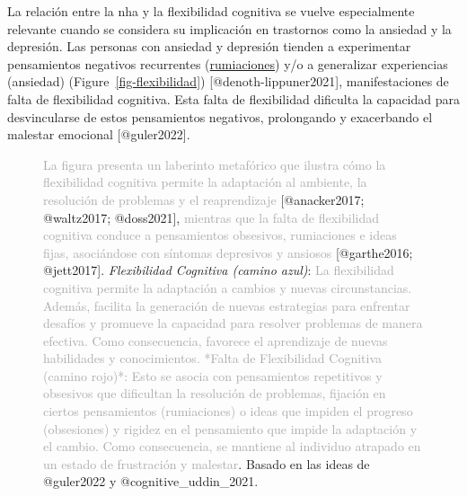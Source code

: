 \documentclass[
  11pt]{../MastersDoctoralThesisUNAM}
\begin{document}
\begin{tcolorbox}[enhanced jigsaw, colframe=quarto-callout-important-color-frame, left=2mm, bottomrule=.15mm, rightrule=.15mm, arc=.35mm, toprule=.15mm, leftrule=.75mm, breakable, opacityback=0, colback=white]
La relación entre la \ac{nha} y la flexibilidad cognitiva se vuelve
especialmente relevante cuando se considera su implicación en trastornos
como la ansiedad y la depresión. Las personas con ansiedad y depresión
tienden a experimentar pensamientos negativos recurrentes
(\href{AppendixB.qmd\#term-id-70}{rumiaciones}) y/o a generalizar
experiencias (ansiedad) (Figure~\ref{fig-flexibilidad})
{[}@denoth-lippuner2021{]}, manifestaciones de falta de flexibilidad
cognitiva. Esta falta de flexibilidad dificulta la capacidad para
desvincularse de estos pensamientos negativos, prolongando y exacerbando
el malestar emocional {[}@guler2022{]}.

\begin{figure}[H]

\begin{minipage}{0.60\linewidth}
\textcolor{darkgray}{La figura presenta un laberinto metafórico que ilustra cómo la flexibilidad cognitiva permite la adaptación al ambiente, la resolución de problemas y el reaprendizaje}
{[}@anacker2017; @waltz2017; @doss2021{]},
\textcolor{darkgray}{mientras que la falta de flexibilidad cognitiva conduce a pensamientos obsesivos, rumiaciones e ideas fijas, asociándose con síntomas depresivos y ansiosos}
{[}@garthe2016; @jett2017{]}. \emph{Flexibilidad Cognitiva (camino
azul)}:
\textcolor{darkgray}{La flexibilidad cognitiva permite la adaptación a cambios y nuevas circunstancias. Además, facilita la generación de nuevas estrategias para enfrentar desafíos y promueve la capacidad para resolver problemas de manera efectiva. Como consecuencia, favorece el aprendizaje de nuevas habilidades y conocimientos. *Falta de Flexibilidad Cognitiva (camino rojo)*: Esto se asocia con pensamientos repetitivos y obsesivos que dificultan la resolución de problemas, fijación en ciertos pensamientos  (rumiaciones) o ideas que impiden el progreso (obsesiones) y rigidez en el pensamiento que impide la adaptación y el cambio. Como consecuencia, se mantiene al individuo atrapado en un estado de frustración y malestar}.
Basado en las ideas de @guler2022 y
@cognitive\_uddin\_2021.\end{minipage}%
%
\begin{minipage}{0.40\linewidth}

\begin{figure}[H]

\centering{

}
\end{figure}
\end{minipage}
\end{figure}
\end{tcolorbox}
\end{document}
